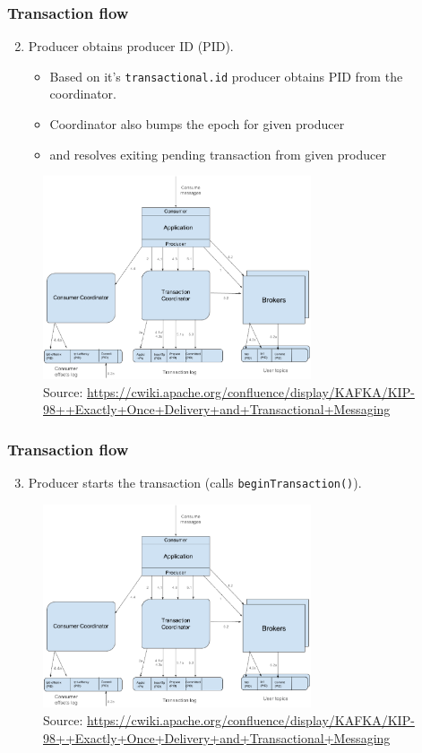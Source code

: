 \documentclass[10pt,utf8]{beamer}
\begin{document}
\begin{frame}
    \frametitle{Transaction flow}
    \begin{enumerate}
        \setcounter{enumi}{1}
        \item Producer obtains producer ID (PID).
        \begin{itemize}
          \item Based on it's \texttt{transactional.id} producer obtains PID from the coordinator.
          \item Coordinator also bumps the epoch for given producer
          \item and resolves exiting pending transaction from given producer 
        \end{itemize}
    \end{enumerate}
    \begin{figure}
        \centering
        \includegraphics[height=6cm]{./img/tx_flow.eps}
        \caption{\tiny{Source: \url{https://cwiki.apache.org/confluence/display/KAFKA/KIP-98++Exactly+Once+Delivery+and+Transactional+Messaging}}}
    \end{figure}
\end{frame}

\begin{frame}
    \frametitle{Transaction flow}
    \begin{enumerate}
        \setcounter{enumi}{2}
        \item Producer starts the transaction (calls \texttt{beginTransaction()}).
    \end{enumerate}
    \begin{figure}
        \centering
        \includegraphics[height=6cm]{./img/tx_flow.eps}
        \caption{\tiny{Source: \url{https://cwiki.apache.org/confluence/display/KAFKA/KIP-98++Exactly+Once+Delivery+and+Transactional+Messaging}}}
    \end{figure}
\end{frame}
\end{document}
